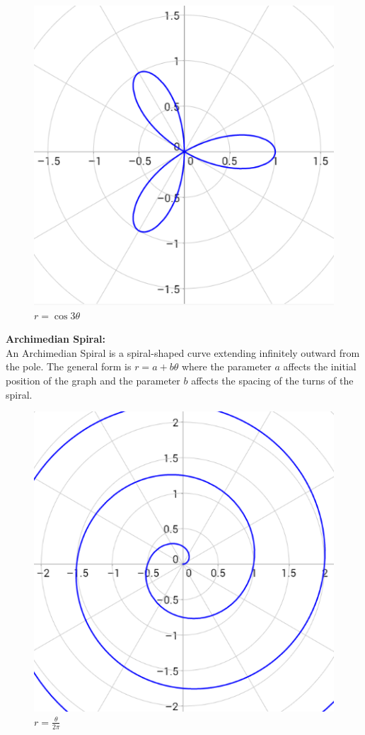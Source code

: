         \begin{figure} [hbt!]
            \centering
            \includegraphics[scale=0.4]{Resources/Unit3Vectors/rose.PNG}
            \caption*{$r=\cos{3\theta}$}
        \end{figure}

        \pagebreak
        \noindent \textbf{Archimedian Spiral:} \\
        An Archimedian Spiral is a spiral-shaped curve extending infinitely outward from the pole.
        The general form is $r=a+b\theta$ where the parameter $a$ affects the initial position of
        the graph and the parameter $b$ affects the spacing of the turns of the spiral. \\

        \begin{figure} [hbt!]
            \centering
            \includegraphics[scale=0.4]{Resources/Unit3Vectors/spiral.PNG}
            \caption*{$r=\frac{\theta}{2\pi}$}
        \end{figure}

